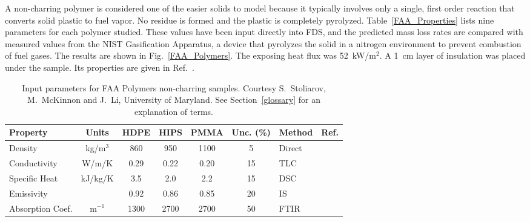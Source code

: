A non-charring polymer is considered one of the easier solids to model because it typically involves only a single, first order reaction that converts solid plastic to fuel vapor.
No residue is formed and the plastic is completely pyrolyzed. Table~\ref{FAA_Properties}
lists nine parameters for each polymer studied. These values have been input directly into FDS, and the predicted mass loss rates are compared with measured values from the NIST
Gasification Apparatus, a device that pyrolyzes the solid in a nitrogen environment to prevent combustion of fuel gases. The results are shown in Fig.~\ref{FAA_Polymers}. The exposing
heat flux was 52~kW/m$^2$. A 1~cm layer of insulation was placed under the sample. Its properties are given in Ref.~\cite{Stoliarov:CF2009}.


\begin{table}[h!]
\caption[FAA non-charring polymer properties.]{Input parameters for FAA Polymers non-charring samples. Courtesy S.~Stoliarov, M.~McKinnon and J.~Li, University of Maryland.
See Section~\ref{glossary} for an explanation of terms.}
\begin{center}
\begin{tabular}{|l|c|c|c|c|c|l|l|}
\hline
Property                    & Units         & HDPE                  & HIPS                  & PMMA                  & Unc. (\%) & Method                &  Ref.                         \\ \hline \hline
Density                     & kg/m$^3$      & 860                   & 950                   & 1100                  & 5         & Direct                &  \cite{Stoliarov:CF2009}      \\ \hline
Conductivity                & W/m/K         & 0.29                  & 0.22                  & 0.20                  & 15        & TLC                   &  \cite{Stoliarov:CF2009}      \\ \hline
Specific Heat               & kJ/kg/K       & 3.5                   & 2.0                   & 2.2                   & 15        & DSC                   &  \cite{Stoliarov:PDS2008}     \\ \hline
Emissivity                  &               & 0.92                  & 0.86                  & 0.85                  & 20        & IS                    &  \cite{Hallman:PES1974}       \\ \hline
Absorption Coef.            & m$^{-1}$      & 1300                  & 2700                  & 2700                  & 50        & FTIR                  &  \cite{Tsilingiris:ECM2003}   \\ \hline

\end{tabular}
\end{center}
\end{table}

